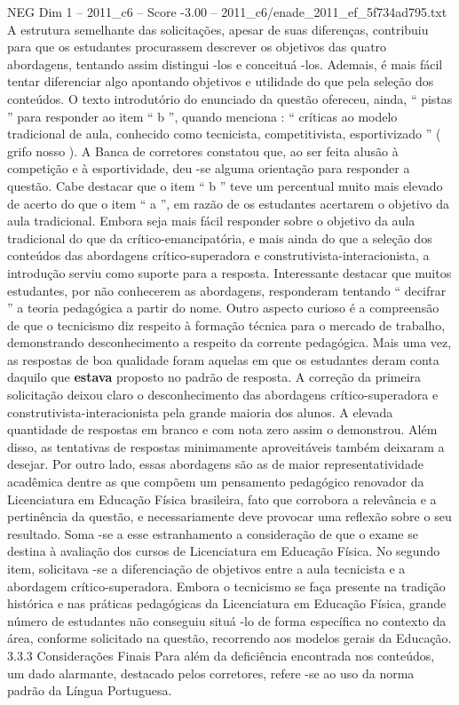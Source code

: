 \begin{textsample}{NEG Dim 1 – 2011\_c6 – Score -3.00 – 2011\_c6/enade\_2011\_ef\_5f734ad795.txt}
A estrutura semelhante das solicitações, apesar de suas diferenças, contribuiu para que os estudantes procurassem descrever os objetivos das quatro abordagens, tentando assim distingui -los e conceituá -los.
Ademais, é mais fácil tentar diferenciar algo apontando objetivos e utilidade do que pela seleção dos conteúdos.
O texto introdutório do enunciado da questão ofereceu, ainda, “ pistas ” para responder ao item “ b ”, quando menciona : “ críticas ao modelo tradicional de aula, conhecido como tecnicista, competitivista, esportivizado ” ( grifo nosso ).
A Banca de corretores constatou que, ao ser feita alusão à competição e à esportividade, deu -se alguma orientação para responder a questão.
Cabe destacar que o item “ b ” teve um percentual muito mais elevado de acerto do que o item “ a ”, em razão de os estudantes acertarem o objetivo da aula tradicional.
Embora seja mais fácil responder sobre o objetivo da aula tradicional do que da crítico-emancipatória, e mais ainda do que a seleção dos conteúdos das abordagens crítico-superadora e construtivista-interacionista, a introdução serviu como suporte para a resposta.
Interessante destacar que muitos estudantes, por não conhecerem as abordagens, responderam tentando “ decifrar ” a teoria pedagógica a partir do nome.
Outro aspecto curioso é a compreensão de que o tecnicismo diz respeito à formação técnica para o mercado de trabalho, demonstrando desconhecimento a respeito da corrente pedagógica.
Mais uma vez, as respostas de boa qualidade foram aquelas em que os estudantes deram conta daquilo que \textbf{estava} proposto no padrão de resposta.
A correção da primeira solicitação deixou claro o desconhecimento das abordagens crítico-superadora e construtivista-interacionista pela grande maioria dos alunos.
A elevada quantidade de respostas em branco e com nota zero assim o demonstrou.
Além disso, as tentativas de respostas minimamente aproveitáveis também deixaram a desejar.
Por outro lado, essas abordagens são as de maior representatividade acadêmica dentre as que compõem um pensamento pedagógico renovador da Licenciatura em Educação Física brasileira, fato que corrobora a relevância e a pertinência da questão, e necessariamente deve provocar uma reflexão sobre o seu resultado.
Soma -se a esse estranhamento a consideração de que o exame se destina à avaliação dos cursos de Licenciatura em Educação Física.
No segundo item, solicitava -se a diferenciação de objetivos entre a aula tecnicista e a abordagem crítico-superadora.
Embora o tecnicismo se faça presente na tradição histórica e nas práticas pedagógicas da Licenciatura em Educação Física, grande número de estudantes não conseguiu situá -lo de forma específica no contexto da área, conforme solicitado na questão, recorrendo aos modelos gerais da Educação. 3.3.3 Considerações Finais Para além da deficiência encontrada nos conteúdos, um dado alarmante, destacado pelos corretores, refere -se ao uso da norma padrão da Língua Portuguesa.

\end{textsample}
